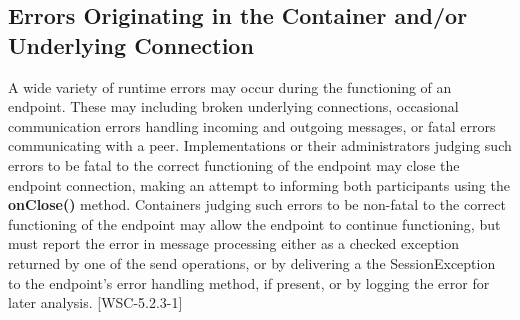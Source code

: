 \subsection{Errors Originating in the Container and/or Underlying Connection}

A wide variety of runtime errors may occur during the functioning of an endpoint. These may including broken underlying connections, occasional communication errors handling incoming and outgoing messages, or fatal errors communicating with a peer. Implementations or their administrators judging such errors to be fatal to the correct functioning of the endpoint may close the endpoint connection, making an attempt to informing both participants using the \textbf{onClose()} method.  Containers judging such errors to be non-fatal to the correct functioning of the endpoint may allow the endpoint to continue functioning, but must report the error in message processing either as a checked exception returned by one of the send operations, or by delivering a the SessionException to the endpoint’s error handling method, if present, or by logging the error for later analysis.  [WSC-5.2.3-1]
